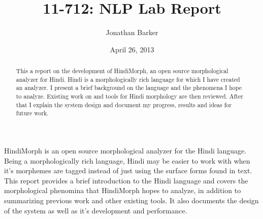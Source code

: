 \documentclass[11pt,letterpaper]{article}
\title{11-712:  NLP Lab Report}
\author{Jonathan Barker}
\date{April 26, 2013}
\begin{document}
\maketitle
\begin{abstract}
This a report on the development of HindiMorph, an open source morphological analyzer for Hindi. Hindi is a morphologically rich language for which I have created an analyzer. I present a brief background on the language and the phenomena I hope to analyze. Existing work on and tools for Hindi morphology are then reviewed. After that I explain the system design and document my progress, results and ideas for future work. 
\end{abstract}

HindiMorph is an open source morphological analyzer for the Hindi language. Being a morphologically rich language, Hindi may be easier to work with when it's morphemes are tagged instead of just using the surface forms found in text. This report provides a brief introduction to the Hindi language and covers the morphological phenomina that HindiMorph hopes to analyze, in addition to summarizing previous work and other existing tools. It also documents the design of the system as well as it's development and performance.
\end{document}
